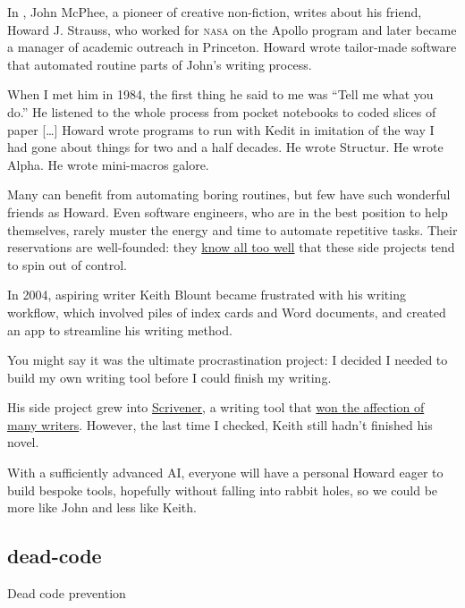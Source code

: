 \documentclass{article}
\begin{document}
In \cite{Draft No. 4}, John McPhee, a pioneer of creative non-fiction, writes about his friend,
Howard J. Strauss, who worked for \textsc{nasa} on the Apollo program and later became a manager of academic outreach in Princeton.
Howard wrote tailor-made software that automated routine parts of John's writing process.

\epigraph{
  When I met him in 1984, the first thing he said to me was ``Tell me what you do.''
  He listened to the whole process from pocket notebooks to coded slices of paper [\ldots]
  Howard wrote programs to run with Kedit in imitation of the way I had gone about things for two and a half decades.
  He wrote Structur. He wrote Alpha. He wrote mini-macros galore.
}{}

Many can benefit from automating boring routines, but few have such wonderful friends as Howard.
Even software engineers, who are in the best position to help themselves, rarely muster the energy and time to automate repetitive tasks.
Their reservations are well-founded: they \href{https://xkcd.com/1319/}{know all too well} that these side projects tend to spin out of control.

In 2004, aspiring writer Keith Blount became frustrated with his writing workflow,
which involved piles of index cards and Word documents,
and created an app to streamline his writing method.

\epigraph{
You might say it was the ultimate procrastination project: I decided I needed to build my own writing tool before I could finish my writing.
}{}

His side project grew into \href{https://www.literatureandlatte.com/scrivener/overview}{Scrivener},
a writing tool that \href{https://podcast.scrivenerapp.com/}{won the affection of many writers}.
However, the last time I checked, Keith still hadn't finished his novel.

With a sufficiently advanced AI, everyone will have a personal Howard eager to build bespoke tools,
hopefully without falling into rabbit holes, so we could be more like John and less like Keith.

\subsection{dead-code}{Dead code prevention}
\end{document}
